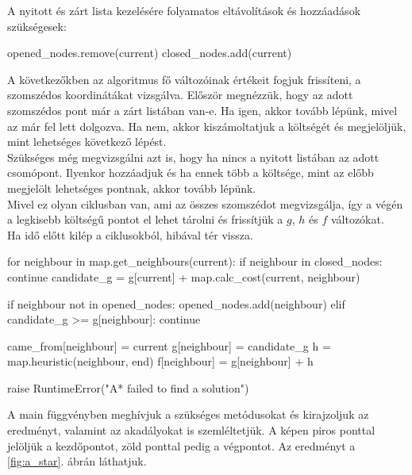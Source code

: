 \bigskip

A nyitott és zárt lista kezelésére folyamatos eltávolítások és hozzáadások szükségesek:

\begin{python}
	opened_nodes.remove(current)
        closed_nodes.add(current)
\end{python}

\bigskip

A következőkben az algoritmus fő változóinak értékeit fogjuk frissíteni, a szomszédos koordinátákat vizsgálva. Először megnézzük, hogy az adott szomszédos pont már a zárt listában van-e. Ha igen, akkor tovább lépünk, mivel az már fel lett dolgozva. Ha nem, akkor kiszámoltatjuk a költségét és megjelöljük, mint lehetséges következő lépést.\\

Szükséges még megvizsgálni azt is, hogy ha nincs a nyitott listában az adott csomópont. Ilyenkor hozzáadjuk és ha ennek több a költsége, mint az előbb megjelölt lehetséges pontnak, akkor tovább lépünk.\\

Mivel ez olyan ciklusban van, ami az összes szomszédot megvizsgálja, így a végén a legkisebb költségű pontot el lehet tárolni és frissítjük a $ g $, $ h $ és $ f $ változókat.\\

Ha idő előtt kilép a ciklusokból, hibával tér vissza.

\begin{python}
	for neighbour in map.get_neighbours(current):
            if neighbour in closed_nodes:
                continue
            candidate_g = g[current] + map.calc_cost(current, neighbour)

            if neighbour not in opened_nodes:
                opened_nodes.add(neighbour)
            elif candidate_g >= g[neighbour]:
                continue

            came_from[neighbour] = current
            g[neighbour] = candidate_g
            h = map.heuristic(neighbour, end)
            f[neighbour] = g[neighbour] + h

    raise RuntimeError("A* failed to find a solution")
\end{python}

\bigskip

A main függvényben meghívjuk a szükséges metódusokat és kirajzoljuk az eredményt, valamint az akadályokat is szemléltetjük. A képen piros ponttal jelöljük a kezdőpontot, zöld ponttal pedig a végpontot. Az eredményt a \ref{fig:a_star}. ábrán láthatjuk.

